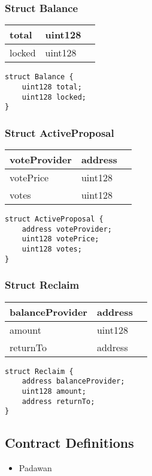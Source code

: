 \subsubsection{Struct Balance}


\ifsoltables
\noindent\begin{tabular}{|l|l|p{6cm}|}\hline
total & uint128 & \\\hline
locked & uint128 & \\\hline
\end{tabular}
\fi


\begin{lstlisting}[firstnumber=16]
struct Balance {
    uint128 total;
    uint128 locked;
}
\end{lstlisting}

\subsubsection{Struct ActiveProposal}


\ifsoltables
\noindent\begin{tabular}{|l|l|p{6cm}|}\hline
voteProvider & address & \\\hline
votePrice & uint128 & \\\hline
votes & uint128 & \\\hline
\end{tabular}
\fi


\begin{lstlisting}[firstnumber=20]
struct ActiveProposal {
    address voteProvider;
    uint128 votePrice;
    uint128 votes;
}
\end{lstlisting}

\subsubsection{Struct Reclaim}


\ifsoltables
\noindent\begin{tabular}{|l|l|p{6cm}|}\hline
balanceProvider & address & \\\hline
amount & uint128 & \\\hline
returnTo & address & \\\hline
\end{tabular}
\fi


\begin{lstlisting}[firstnumber=25]
struct Reclaim {
    address balanceProvider;
    uint128 amount;
    address returnTo;
}
\end{lstlisting}

\subsection{Contract Definitions}

\begin{itemize}
\item Padawan
\end{itemize}
